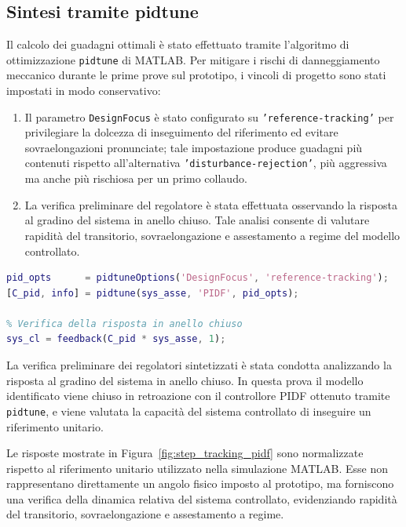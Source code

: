 \documentclass[11pt]{report}
\begin{document}
\subsection{Sintesi tramite pidtune}

Il calcolo dei guadagni ottimali è stato effettuato tramite l'algoritmo di ottimizzazione \texttt{pidtune} di MATLAB. Per mitigare i rischi di danneggiamento meccanico durante le prime prove sul prototipo, i vincoli di progetto sono stati impostati in modo conservativo:
\begin{enumerate}
	\item Il parametro \texttt{DesignFocus} è stato configurato su \texttt{'reference-tracking'} per privilegiare la dolcezza di inseguimento del riferimento ed evitare sovraelongazioni pronunciate; tale impostazione produce guadagni più contenuti rispetto all'alternativa \texttt{'disturbance-rejection'}, più aggressiva ma anche più rischiosa per un primo collaudo.
	\item La verifica preliminare del regolatore è stata effettuata osservando la risposta al gradino del sistema in anello chiuso. Tale analisi consente di valutare rapidità del transitorio, sovraelongazione e assestamento a regime del modello controllato.
\end{enumerate}

\begin{lstlisting}[language=Matlab, caption={Sintesi del controllore PIDF con pidtune}]
pid_opts      = pidtuneOptions('DesignFocus', 'reference-tracking');
[C_pid, info] = pidtune(sys_asse, 'PIDF', pid_opts);

% Verifica della risposta in anello chiuso
sys_cl = feedback(C_pid * sys_asse, 1);
\end{lstlisting}

La verifica preliminare dei regolatori sintetizzati è stata condotta analizzando la risposta al gradino del sistema in anello chiuso. In questa prova il modello identificato viene chiuso in retroazione con il controllore PIDF ottenuto tramite \texttt{pidtune}, e viene valutata la capacità del sistema controllato di inseguire un riferimento unitario.

Le risposte mostrate in Figura~\ref{fig:step_tracking_pidf} sono normalizzate rispetto al riferimento unitario utilizzato nella simulazione MATLAB. Esse non rappresentano direttamente un angolo fisico imposto al prototipo, ma forniscono una verifica della dinamica relativa del sistema controllato, evidenziando rapidità del transitorio, sovraelongazione e assestamento a regime.
\end{document}

